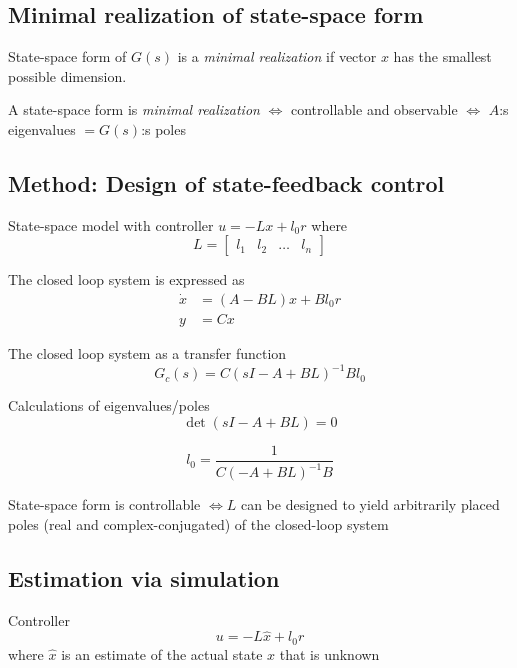 \documentclass{article}
\begin{document}
\subsection{Minimal realization of state-space form}
State-space form of $G(s)$ is a \textit{minimal realization} if vector $x$ has the 
smallest possible dimension.

A state-space form is \textit{minimal realization} $\Leftrightarrow$ controllable and 
observable $\Leftrightarrow$ $A$:s eigenvalues $= G(s)$:s poles 

\subsection{Method: Design of state-feedback control}
State-space model with controller $u=-Lx+l_0r$ where
\begin{equation*}
    L = \begin{bmatrix} l_1 & l_2 & \ldots & l_n \end{bmatrix}
\end{equation*}

The closed loop system is expressed as
\begin{align*}
    \dot{x} &= (A-BL)x + Bl_0r \\ 
    y &= Cx 
\end{align*}

The closed loop system as a transfer function
\begin{equation*}
    G_c(s) = C(sI-A+BL)^{-1} Bl_0 
\end{equation*}

Calculations of eigenvalues/poles
\begin{equation*}
   \det(sI-A+BL) = 0
\end{equation*}

\begin{equation*}
    l_0 = \frac{1}{C(-A+BL)^{-1}B}
\end{equation*}

State-space form is controllable $\Leftrightarrow L$ can be designed to yield
arbitrarily placed poles (real and complex-conjugated) of the
closed-loop system

\subsection{Estimation via simulation}
Controller
\begin{equation*}
    u = -L\hat{x} + l_0r
\end{equation*}
where $\hat{x}$ is an estimate of the actual state $x$ that is unknown
\end{document}
